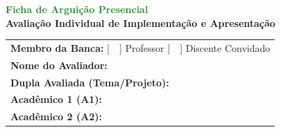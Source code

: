 \documentclass[12pt,a4paper]{article}
\begin{document}
\begin{center}
    {\huge \textbf{\textcolor{forestgreen}{Ficha de Arguição Presencial}}} \\[0.3cm]
    {\large \textbf{Avaliação Individual de Implementação e Apresentação}} \\[0.8cm]
\end{center}

\begin{tcolorbox}[colback=white, colframe=forestgreen, title=\textbf{Identificação da Avaliação}, fonttitle=\bfseries]
    \renewcommand{\arraystretch}{1.5}
    \begin{tabular}{p{}}
         \textbf{Membro da Banca:} [~~] Professor \hspace{1cm} [~~] Discente Convidado \\
         \textbf{Nome do Avaliador:} \underline{\hspace{10cm}} \\
         \textbf{Dupla Avaliada (Tema/Projeto):} \underline{\hspace{8.5cm}} \\
         \textbf{Acadêmico 1 (A1):} \underline{\hspace{12cm}} \\
         \textbf{Acadêmico 2 (A2):} \underline{\hspace{12cm}} \\
    \end{tabular}
\end{tcolorbox}

\vspace{0.8cm}
\end{document}
